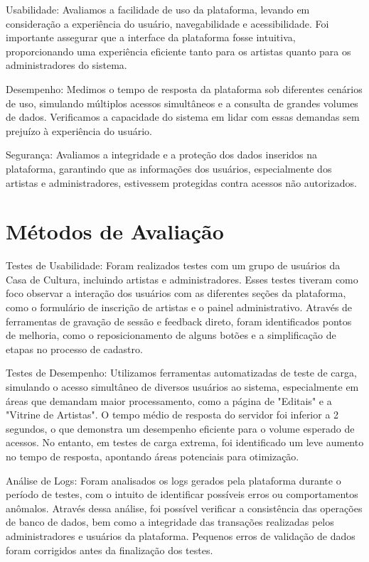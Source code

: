 Usabilidade: Avaliamos a facilidade de uso da plataforma, levando em consideração a experiência do usuário, navegabilidade e acessibilidade. Foi importante assegurar que a interface da plataforma fosse intuitiva, proporcionando uma experiência eficiente tanto para os artistas quanto para os administradores do sistema.

Desempenho: Medimos o tempo de resposta da plataforma sob diferentes cenários de uso, simulando múltiplos acessos simultâneos e a consulta de grandes volumes de dados. Verificamos a capacidade do sistema em lidar com essas demandas sem prejuízo à experiência do usuário.

Segurança: Avaliamos a integridade e a proteção dos dados inseridos na plataforma, garantindo que as informações dos usuários, especialmente dos artistas e administradores, estivessem protegidas contra acessos não autorizados.

\section{Métodos de Avaliação}
Testes de Usabilidade: Foram realizados testes com um grupo de usuários da Casa de Cultura, incluindo artistas e administradores. Esses testes tiveram como foco observar a interação dos usuários com as diferentes seções da plataforma, como o formulário de inscrição de artistas e o painel administrativo. Através de ferramentas de gravação de sessão e feedback direto, foram identificados pontos de melhoria, como o reposicionamento de alguns botões e a simplificação de etapas no processo de cadastro.

Testes de Desempenho: Utilizamos ferramentas automatizadas de teste de carga, simulando o acesso simultâneo de diversos usuários ao sistema, especialmente em áreas que demandam maior processamento, como a página de "Editais" e a "Vitrine de Artistas". O tempo médio de resposta do servidor foi inferior a 2 segundos, o que demonstra um desempenho eficiente para o volume esperado de acessos. No entanto, em testes de carga extrema, foi identificado um leve aumento no tempo de resposta, apontando áreas potenciais para otimização.

Análise de Logs: Foram analisados os logs gerados pela plataforma durante o período de testes, com o intuito de identificar possíveis erros ou comportamentos anômalos. Através dessa análise, foi possível verificar a consistência das operações de banco de dados, bem como a integridade das transações realizadas pelos administradores e usuários da plataforma. Pequenos erros de validação de dados foram corrigidos antes da finalização dos testes.

